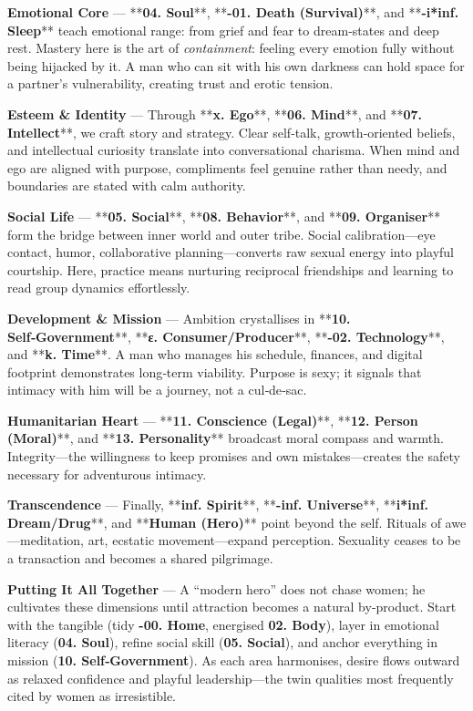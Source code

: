 \documentclass[12pt]{book}
\begin{document}
\bigskip
\textbf{Emotional Core} — **\textbf{04. Soul}**, **\textbf{-01. Death (Survival)}**, and **\textbf{-i*inf. Sleep}** teach emotional range: from grief and fear to dream‑states and deep rest.  Mastery here is the art of \emph{containment}: feeling every emotion fully without being hijacked by it.  A man who can sit with his own darkness can hold space for a partner’s vulnerability, creating trust and erotic tension.

\bigskip
\textbf{Esteem \& Identity} — Through **\textbf{x. Ego}**, **\textbf{06. Mind}**, and **\textbf{07. Intellect}**, we craft story and strategy.  Clear self‑talk, growth‑oriented beliefs, and intellectual curiosity translate into conversational charisma.  When mind and ego are aligned with purpose, compliments feel genuine rather than needy, and boundaries are stated with calm authority.

\bigskip
\textbf{Social Life} — **\textbf{05. Social}**, **\textbf{08. Behavior}**, and **\textbf{09. Organiser}** form the bridge between inner world and outer tribe.  Social calibration—eye contact, humor, collaborative planning—converts raw sexual energy into playful courtship.  Here, practice means nurturing reciprocal friendships and learning to read group dynamics effortlessly.

\bigskip
\textbf{Development \& Mission} — Ambition crystallises in **\textbf{10. Self‑Government}**, **\textbf{ε. Consumer/Producer}**, **\textbf{-02. Technology}**, and **\textbf{k. Time}**.  A man who manages his schedule, finances, and digital footprint demonstrates long‑term viability.  Purpose is sexy; it signals that intimacy with him will be a journey, not a cul‑de‑sac.

\bigskip
\textbf{Humanitarian Heart} — **\textbf{11. Conscience (Legal)}**, **\textbf{12. Person (Moral)}**, and **\textbf{13. Personality}** broadcast moral compass and warmth.  Integrity—the willingness to keep promises and own mistakes—creates the safety necessary for adventurous intimacy.

\bigskip
\textbf{Transcendence} — Finally, **\textbf{inf. Spirit}**, **\textbf{-inf. Universe}**, **\textbf{i*inf. Dream/Drug}**, and **\textbf{Human (Hero)}** point beyond the self.  Rituals of awe—meditation, art, ecstatic movement—expand perception.  Sexuality ceases to be a transaction and becomes a shared pilgrimage.

\bigskip
\textbf{Putting It All Together} — A “modern hero” does not chase women; he cultivates these dimensions until attraction becomes a natural by‑product.  Start with the tangible (tidy \textbf{-00. Home}, energised \textbf{02. Body}), layer in emotional literacy (\textbf{04. Soul}), refine social skill (\textbf{05. Social}), and anchor everything in mission (\textbf{10. Self‑Government}).  As each area harmonises, desire flows outward as relaxed confidence and playful leadership—the twin qualities most frequently cited by women as irresistible.


\end{document}
